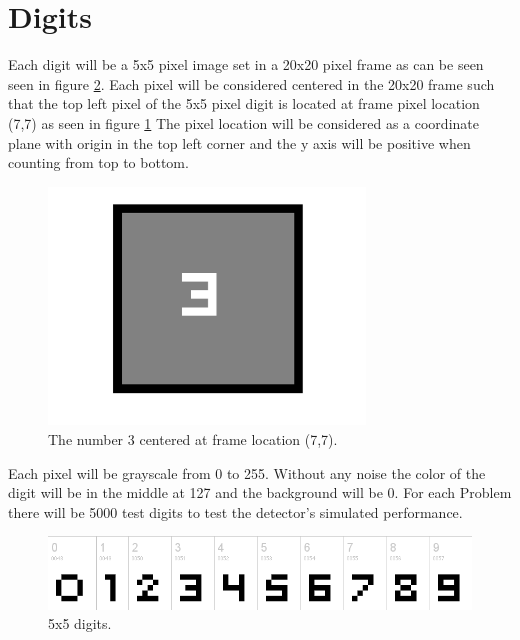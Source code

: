 \documentclass[12pt]{article}
\begin{document}
\section{Digits}
	Each digit will be a 5x5 pixel image set in a 20x20 pixel frame as can be seen seen
		in figure \ref{fig:digits}.
	Each pixel will be considered centered in the 20x20 frame such that the top left pixel
		of the 5x5 pixel digit is located at frame pixel location (7,7) as seen in figure
		\ref{fig:centeredDigit}
	The pixel location will be considered as a coordinate plane with origin in the top left
		corner and the y axis will be positive when counting from top to bottom.
	\begin{figure}[h]
		\centering
		\includegraphics[width=0.75\textwidth]{centeredDigit.png}
		\caption{The number 3 centered at frame location (7,7).}
		\label{fig:centeredDigit}
	\end{figure}
	Each pixel will be grayscale from 0 to 255.
	Without any noise the color of the digit will be in the middle at 127 and the
		background will be 0.
	For each Problem there will be 5000 test digits to test the detector's simulated
		performance.
	\begin{figure}[b]
		\centering
		\includegraphics[width=\textwidth]{digits.png}
		\caption{5x5 digits.}
		\label{fig:digits}
	\end{figure}
\end{document}
